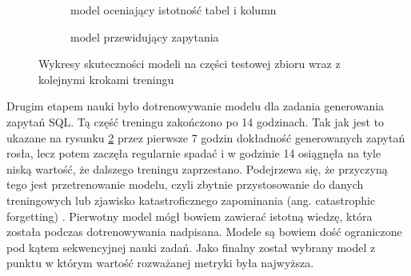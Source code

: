 \begin{figure}[ht!]
\centering
\begin{subfigure}{0.49\textwidth}
    \caption{model oceniający istotność tabel i kolumn}
    \label{plot:resdsql-classifier-accuracy}
\end{subfigure}
\hfill
\begin{subfigure}{0.49\textwidth}
    \caption{model przewidujący zapytania}
    \label{plot:resdsql-t5-accuracy}
\end{subfigure}
\caption{Wykresy skuteczności modeli  na części testowej zbioru  wraz z kolejnymi krokami treningu}
\label{plot:resdsql-accuracy}
\end{figure}

Drugim etapem nauki było dotrenowywanie modelu  dla zadania generowania zapytań SQL. Tą część treningu zakończono po 14 godzinach. Tak jak jest to ukazane na rysunku \ref{plot:resdsql-t5-accuracy} przez pierwsze 7 godzin dokładność generowanych zapytań rosła, lecz potem zaczęła regularnie spadać i w godzinie 14 osiągnęła na tyle niską wartość, że dalszego treningu zaprzestano. Podejrzewa się, że przyczyną tego jest przetrenowanie modelu, czyli zbytnie przystosowanie do danych treningowych lub zjawisko katastroficznego zapominania (ang. catastrophic forgetting) \cite{Kirkpatrick2016}. Pierwotny model  mógł bowiem zawierać istotną wiedzę, która została podczas dotrenowywania nadpisana. Modele są bowiem dość ograniczone pod kątem sekwencyjnej nauki zadań. Jako finalny został wybrany model z punktu w którym wartość rozważanej metryki była najwyższa.

